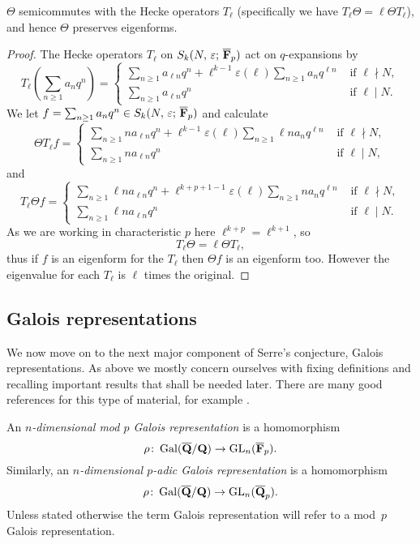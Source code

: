 \documentclass[a4paper,12pt]{article}
\begin{document}
\begin{prop}\label{prop:thetaeigen}
$\Theta$ semicommutes with the Hecke operators $T_{\ell}$ (specifically we have $T_{\ell}\Theta = \ell\Theta T_{\ell}$), and hence $\Theta$ preserves eigenforms.
\end{prop}
\begin{proof}
The Hecke operators $T_{\ell}$ on $S_k(N,\,\varepsilon;\,\overline{\mathbf{F}}_p)$ act on $q$-expansions by
\[
T_{\ell}\left(\sum_{n\ge 1} a_nq^n\right) = \begin{cases}
\sum_{n\ge 1} a_{\ell n}q^n + \ell^{k-1}\varepsilon(\ell)\sum_{n\ge 1} a_{n}q^{\ell n} &\text{ if }\ell \nmid N,\\
\sum_{n\ge 1} a_{\ell n}q^n &\text{ if }\ell \mid N.
\end{cases}
\]
We let $f = \sum_{n\ge 1} a_nq^n\in S_k(N,\,\varepsilon;\,\overline{\mathbf{F}}_p)$ and calculate
\[
\Theta T_{\ell} f = \begin{cases}
\sum_{n\ge 1} na_{\ell n}q^n + \ell^{k-1}\varepsilon(\ell)\sum_{n\ge 1} \ell n a_{n}q^{\ell n} &\text{ if }\ell \nmid N,\\
\sum_{n\ge 1} na_{\ell n}q^n &\text{ if }\ell \mid N,
\end{cases}
\]
and
\[
T_{\ell}\Theta f = \begin{cases}
\sum_{n\ge 1} \ell n a_{\ell n}q^n + \ell^{k+p+1-1} \varepsilon(\ell)\sum_{n\ge 1} n a_{n}q^{\ell n} &\text{ if }\ell \nmid N,\\
\sum_{n\ge 1} \ell n a_{\ell n}q^n &\text{ if }\ell \mid N.
\end{cases}
\]
As we are working in characteristic $p$ here $\ell^{k+p} = \ell^{k+1}$, so
\[
 T_{\ell} \Theta = \ell \Theta T_{\ell},
\]
thus if $f$ is an eigenform for the $T_\ell$ then $\Theta f$ is an eigenform too.
However the eigenvalue for each $T_\ell$ is $\ell$ times the original.
\end{proof}


\subsection{Galois representations}\label{sec:gals}
We now move on to the next major component of Serre's conjecture, Galois representations.
As above we mostly concern ourselves with fixing definitions and recalling important results that shall be needed later.
There are many good references for this type of material, for example \cite{DDT,WieseGal}. %

\begin{defn}
An \emph{$n$-dimensional mod $p$ Galois representation} is a homomorphism
\[
\rho\colon \operatorname{Gal}(\overline{\mathbf{Q}}/\mathbf{Q}) \to \operatorname{GL}_n(\overline{\mathbf{F}}_p).
\]
Similarly, an \emph{$n$-dimensional $p$-adic Galois representation} is a homomorphism
\[
\rho\colon \operatorname{Gal}(\overline{\mathbf{Q}}/\mathbf{Q}) \to \operatorname{GL}_n(\overline{\mathbf{Q}}_p).
\]
Unless stated otherwise the term Galois representation will refer to a mod~$p$ Galois representation.
\end{defn}
\end{document}
